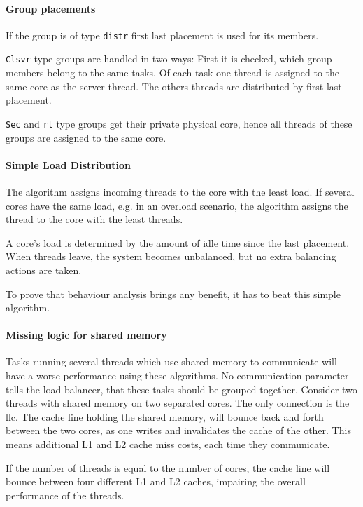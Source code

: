 \paragraph{Group placements}
If the group is of type \texttt{distr} first last placement is used for its
members.

\texttt{Clsvr} type groups are handled in two ways: First it is checked, which
group members belong to the same tasks.
Of each task one thread is assigned to the same core as the server thread.
The others threads are distributed by first last placement.

\texttt{Sec} and \texttt{rt} type groups get their private physical core, hence
all threads of these groups are assigned to the same core.


\paragraph{Simple Load Distribution}
The algorithm assigns incoming threads to the core with the least load.
If several cores have the same load, e.g. in an overload scenario, the
algorithm assigns the thread to the core with the least threads.

A core's load is determined by the amount of idle time since the last
placement.
When threads leave, the system becomes unbalanced, but no extra balancing
actions are taken.

To prove that behaviour analysis brings any benefit, it has to beat
this simple algorithm.


\paragraph{Missing logic for shared memory}
Tasks running several threads which use shared memory to communicate will have
a worse performance using these algorithms.
No communication parameter tells the load balancer, that these tasks should be
grouped together.
Consider two threads with shared memory on two separated cores.
The only connection is the \gls{llc}.
The cache line holding the shared memory, will bounce back and forth between
the two cores, as one writes and invalidates the cache of the other.
This means additional L1 and L2 cache miss costs, each time they communicate.

If the number of threads is equal to the number of cores, the cache line will
bounce between four different L1 and L2 caches, impairing the overall
performance of the threads.

